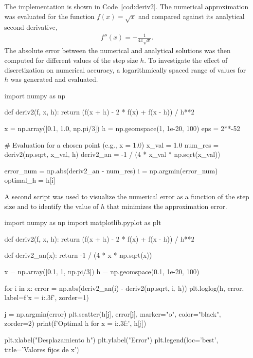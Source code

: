 \documentclass[../portafolio.tex]{subfiles}
\begin{document}
The implementation is shown in Code~\ref{cod:deriv2}. The numerical approximation was evaluated for the function $f(x)=\sqrt{x}$ and compared against its analytical second derivative,
\begin{align*}
f''(x) = -\frac{1}{4x\sqrt{x}}.
\end{align*}
The absolute error between the numerical and analytical solutions was then computed for different values of the step size $h$. To investigate the effect of discretization on numerical accuracy, a logarithmically spaced range of values for $h$ was generated and evaluated.

\begin{listing}
\begin{pythoncode}
import numpy as np

def deriv2(f, x, h):
    return (f(x + h) - 2 * f(x) + f(x - h)) / h**2

x = np.array([0.1, 1.0, np.pi/3])
h = np.geomspace(1, 1e-20, 100)
eps = 2**-52

# Evaluation for a chosen point (e.g., x = 1.0)
x_val = 1.0
num_res = deriv2(np.sqrt, x_val, h)
deriv2_an = -1 / (4 * x_val * np.sqrt(x_val))

error_num = np.abs(deriv2_an - num_res)
i = np.argmin(error_num)
optimal_h = h[i]
\end{pythoncode}
\caption{Implementation of the numerical second derivative for $f(x)=\sqrt{x}$.}
\label{cod:deriv2}
\end{listing}

A second script was used to visualize the numerical error as a function of the step size and to identify the value of $h$ that minimizes the approximation error.

\begin{listing}
\begin{pythoncode}
import numpy as np
import matplotlib.pyplot as plt

def deriv2(f, x, h):
    return (f(x + h) - 2 * f(x) + f(x - h)) / h**2

def deriv2_an(x):
    return -1 / (4 * x * np.sqrt(x))

x = np.array([0.1, 1, np.pi/3])
h = np.geomspace(0.1, 1e-20, 100)

for i in x:
    error = np.abs(deriv2_an(i) - deriv2(np.sqrt, i, h))
    plt.loglog(h, error, label=f'x = {i:.3f}', zorder=1)
    
    j = np.argmin(error)
    plt.scatter(h[j], error[j], marker="o", color="black", zorder=2)
    print(f'Optimal h for x = {i:.3f}:', h[j])

plt.xlabel("Desplazamiento h")
plt.ylabel("Error")
plt.legend(loc='best', title='Valores fijos de x')
\end{pythoncode}
\caption{Error analysis for the numerical approximation of the second derivative.}
\label{cod:deriv2_error}
\end{listing}
\end{document}

